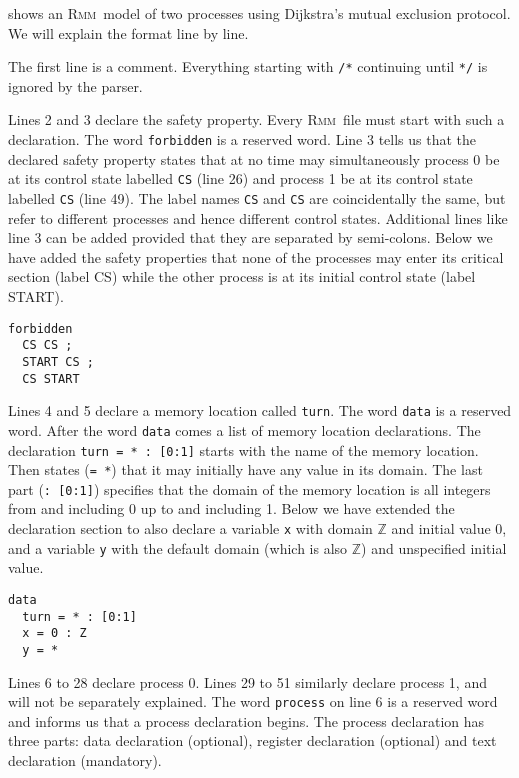 \documentclass[a4paper]{article}
\newcommand{\rmm}{\textsc{Rmm}}
\begin{document}
 shows an \rmm\ model of two processes using
Dijkstra's mutual exclusion protocol. We will explain the format line
by line.

The first line is a comment. Everything starting with \verb+/*+
continuing until \verb+*/+ is ignored by the parser.

Lines 2 and 3 declare the safety property. Every \rmm\ file must start
with such a declaration. The word \verb+forbidden+ is a reserved
word. Line 3 tells us that the declared safety property states that at
no time may simultaneously process 0 be at its control state labelled
\verb+CS+ (line 26) and process 1 be at its control state labelled
\verb+CS+ (line 49). The label names \verb+CS+ and \verb+CS+ are
coincidentally the same, but refer to different processes and hence
different control states. Additional lines like line 3 can be added
provided that they are separated by semi-colons. Below we have added
the safety properties that none of the processes may enter its
critical section (label CS) while the other process is at its initial
control state (label START).

\begin{verbatim}
forbidden
  CS CS ;
  START CS ;
  CS START
\end{verbatim}

Lines 4 and 5 declare a memory location called \verb+turn+. The word
\verb+data+ is a reserved word. After the word \verb+data+ comes a
list of memory location declarations. The declaration
\verb+turn = * : [0:1]+ starts with the name of the memory location.
Then states (\verb+= *+) that it may initially have any value in its
domain. The last part (\verb+: [0:1]+) specifies that the domain of
the memory location is all integers from and including 0 up to and
including 1. Below we have extended the declaration section to also
declare a variable \verb+x+ with domain $\mathbb{Z}$ and initial
value 0, and a variable \verb+y+ with the default domain (which is
also $\mathbb{Z}$) and unspecified initial value.

\begin{verbatim}
data
  turn = * : [0:1]
  x = 0 : Z
  y = *
\end{verbatim}

Lines 6 to 28 declare process 0. Lines 29 to 51 similarly declare
process 1, and will not be separately explained. The word
\verb+process+ on line 6 is a reserved word and informs us that a
process declaration begins. The process declaration has three parts:
data declaration (optional), register declaration (optional) and text
declaration (mandatory).
\end{document}
